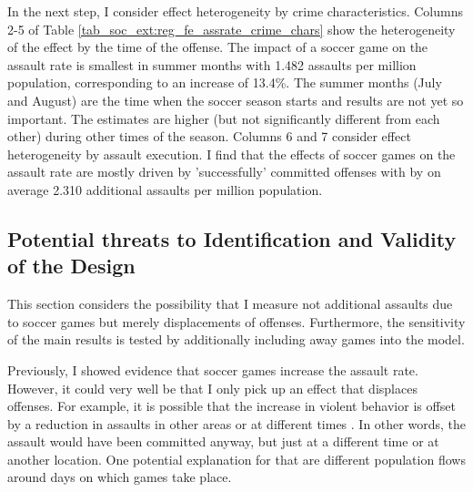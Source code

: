 \documentclass[11pt, a4paper]{article} %
\begin{document}
In the next step, I consider effect heterogeneity by crime characteristics. Columns 2-5 of Table \ref{tab_soc_ext:reg_fe_assrate_crime_chars} show the heterogeneity of the effect by the time of the offense. The impact of a soccer game on the assault rate is smallest in summer months with 1.482 assaults per million population, corresponding to an increase of 13.4\%. The summer months (July and August) are the time when the soccer season starts and results are not yet so important. The estimates are higher (but not significantly different from each other) during other times of the season. Columns 6 and 7 consider effect heterogeneity by assault execution. I find that the effects of soccer games on the assault rate are mostly driven by 'successfully' committed offenses with by on average 2.310 additional assaults per million population.




\subsection{Potential threats to Identification and Validity of the Design}
 This section considers the possibility that I measure not additional assaults due to soccer games but merely displacements of offenses. Furthermore, the sensitivity of the main results is tested by additionally including away games into the model.

Previously, I showed evidence that soccer games increase the assault rate. However, it could very well be that I only pick up an effect that displaces offenses. For example, it is possible that the increase in violent behavior is offset by a reduction in assaults in other areas or at different times \citep{lindo2018college}. In other words, the assault would have been committed anyway, but just at a different time or at another location. One potential explanation for that are different population flows around days on which games take place.
\end{document}
